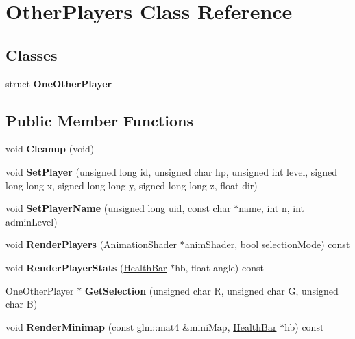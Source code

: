 \hypertarget{classOtherPlayers}{\section{\-Other\-Players \-Class \-Reference}
\label{classOtherPlayers}
}
\subsection*{\-Classes}
\begin{DoxyCompactItemize}
\item 
struct {\bfseries \-One\-Other\-Player}
\end{DoxyCompactItemize}
\subsection*{\-Public \-Member \-Functions}
\begin{DoxyCompactItemize}
\item 
\hypertarget{classOtherPlayers_aaf13dca14e26b815d99f4a8906aa7913}{void {\bfseries \-Cleanup} (void)}\label{classOtherPlayers_aaf13dca14e26b815d99f4a8906aa7913}

\item 
\hypertarget{classOtherPlayers_a5478a24371893c3cf31486932fe80933}{void {\bfseries \-Set\-Player} (unsigned long id, unsigned char hp, unsigned int level, signed long long x, signed long long y, signed long long z, float dir)}\label{classOtherPlayers_a5478a24371893c3cf31486932fe80933}

\item 
\hypertarget{classOtherPlayers_a17e3724b9eafb5d2458ab7c37cf03787}{void {\bfseries \-Set\-Player\-Name} (unsigned long uid, const char $\ast$name, int n, int admin\-Level)}\label{classOtherPlayers_a17e3724b9eafb5d2458ab7c37cf03787}

\item 
\hypertarget{classOtherPlayers_a48df458b7ea6db73624a059b912781d1}{void {\bfseries \-Render\-Players} (\hyperlink{classAnimationShader}{\-Animation\-Shader} $\ast$anim\-Shader, bool selection\-Mode) const }\label{classOtherPlayers_a48df458b7ea6db73624a059b912781d1}

\item 
\hypertarget{classOtherPlayers_a2ddc2ab1873fa5e7fb31f5b4dc0dfae0}{void {\bfseries \-Render\-Player\-Stats} (\hyperlink{classHealthBar}{\-Health\-Bar} $\ast$hb, float angle) const }\label{classOtherPlayers_a2ddc2ab1873fa5e7fb31f5b4dc0dfae0}

\item 
\hypertarget{classOtherPlayers_a3aac7bedea552c3c7affdf373b9f20fa}{\-One\-Other\-Player $\ast$ {\bfseries \-Get\-Selection} (unsigned char \-R, unsigned char \-G, unsigned char \-B)}\label{classOtherPlayers_a3aac7bedea552c3c7affdf373b9f20fa}

\item 
\hypertarget{classOtherPlayers_ae5305ae3e8be76f8bf888d811fb16e70}{void {\bfseries \-Render\-Minimap} (const glm\-::mat4 \&mini\-Map, \hyperlink{classHealthBar}{\-Health\-Bar} $\ast$hb) const }\label{classOtherPlayers_ae5305ae3e8be76f8bf888d811fb16e70}

\end{DoxyCompactItemize}


